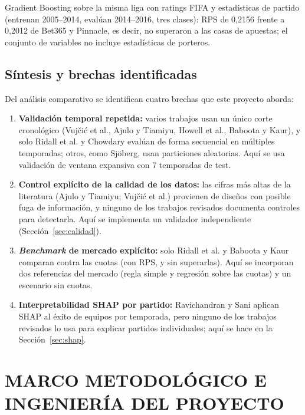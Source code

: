 \documentclass[12pt,letterpaper,oneside]{report}
\begin{document}
Gradient Boosting sobre la misma liga con ratings FIFA y estadísticas de partido (entrenan 2005--2014, evalúan 2014--2016, tres clases): RPS de 0,2156 frente a 0,2012 de Bet365 y Pinnacle, es decir, no superaron a las casas de apuestas; el conjunto de variables no incluye estadísticas de porteros.

\section{Síntesis y brechas identificadas}
Del análisis comparativo se identifican cuatro brechas que este proyecto aborda:
\begin{enumerate}
\item \textbf{Validación temporal repetida:} varios trabajos usan un único corte cronológico (Vujčić et al., Ajulo y Tiamiyu, Howell et al., Baboota y Kaur), y solo Ridall et al. y Chowdary evalúan de forma secuencial en múltiples temporadas; otros, como Sjöberg, usan particiones aleatorias. Aquí se usa validación de ventana expansiva con 7 temporadas de test.
\item \textbf{Control explícito de la calidad de los datos:} las cifras más altas de la literatura (Ajulo y Tiamiyu; Vujčić et al.) provienen de diseños con posible fuga de información, y ninguno de los trabajos revisados documenta controles para detectarla. Aquí se implementa un validador independiente (Sección~\ref{sec:calidad}).
\item \textbf{\textit{Benchmark} de mercado explícito:} solo Ridall et al. y Baboota y Kaur comparan contra las cuotas (con RPS, y sin superarlas). Aquí se incorporan dos referencias del mercado (regla simple y regresión sobre las cuotas) y un escenario sin cuotas.
\item \textbf{Interpretabilidad SHAP por partido:} Ravichandran y Sani aplican SHAP al éxito de equipos por temporada, pero ninguno de los trabajos revisados lo usa para explicar partidos individuales; aquí se hace en la Sección~\ref{sec:shap}.
\end{enumerate}

\chapter{MARCO METODOLÓGICO E INGENIERÍA DEL PROYECTO}
\label{sec:ingenieria}
\end{document}
